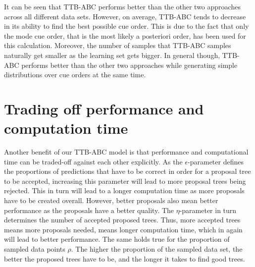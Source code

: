 \documentclass[a4paper,man, natbib]{apa6}
\begin{document}
It can be seen that TTB-ABC performs better than the other two approaches across all different data sets. However, on average, TTB-ABC tends to decrease in its ability to find the best possible cue order. This is due to the fact that only the mode cue order, that is the most likely a posteriori order, has been used for this calculation. Moreover, the number of samples that TTB-ABC samples naturally get smaller as the learning set gets bigger. In general though, TTB-ABC performs better than the other two approaches while generating simple distributions over cue orders at the same time.


\section{Trading off performance and computation time}
Another benefit of our TTB-ABC model is that performance and computational time can be traded-off against each other explicitly. As the $\epsilon$-parameter defines the proportions of predictions that have to be correct in order for a proposal tree to be accepted, increasing this parameter will lead to more proposal trees being rejected. This in turn will lead to a longer computation time as more proposals have to be created overall. However, better proposals also mean better performance as the proposals have a better quality. The $\eta$-parameter in turn determines the number of accepted proposed trees. Thus, more accepted trees means more proposals needed, means longer computation time, which in again will lead to better performance. The same holds true for the proportion of sampled data points $\rho$. The higher the proportion of the sampled data set, the better the proposed trees have to be, and the longer it takes to find good trees. 
\end{document}
